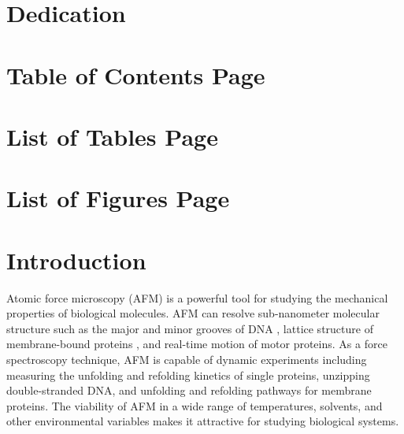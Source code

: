 \documentclass[%
  aip,12pt,tightenlines,
  amsthm,
 amsmath,amssymb
]{article}
\newcommand{\sLabel}[1]{\label{section:#1}}
\newcommand{\firstp}[0]{}
\newcommand{\pl}[0]{\vspace{6pt}}
\newcommand{\citePRH}[1]{\cite{#1}}
\begin{document}
\clearpage

\section{Dedication}

\clearpage

\section{Table of Contents Page}

\tableofcontents

\clearpage

\section{List of Tables Page}

\listoftables

\clearpage

\section{List of Figures Page}

\listoffigures
 
\clearpage


\maketitle

\doublespacing

\section{\sLabel{Intro}Introduction}

\firstp Atomic force microscopy (AFM) is a powerful tool for studying the mechanical properties of biological molecules.  AFM can resolve sub-nanometer molecular structure such as the major and minor grooves of DNA \citePRH{ido_beyond_2013}, lattice structure of membrane-bound proteins \citePRH{muller_surface_1999}, and real-time motion of motor proteins\citePRH{ando_high-speed_2007}. As a force spectroscopy technique, AFM is capable of dynamic experiments including measuring the unfolding and refolding kinetics of single proteins\citePRH{he_direct_2015}, unzipping double-stranded DNA\citePRH{krautbauer_Unzipping_2003}, and unfolding and refolding pathways for membrane proteins\citePRH{yu_hidden_2017}. The viability of AFM in a wide range of temperatures, solvents, and other environmental variables makes it attractive for studying biological systems. \pl
\end{document}
